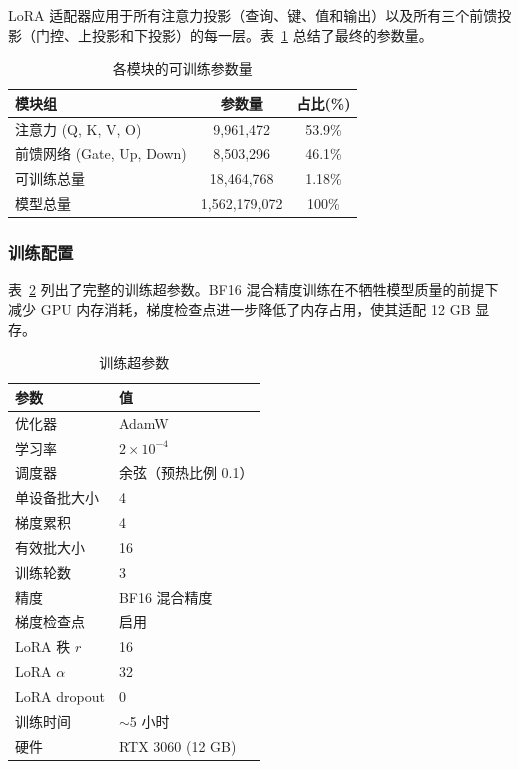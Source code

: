 \documentclass[12pt,a4paper]{article}
\begin{document}
LoRA 适配器应用于所有注意力投影（查询、键、值和输出）以及所有三个前馈投影（门控、上投影和下投影）的每一层。表~\ref{tab:lora_params} 总结了最终的参数量。

\begin{table}[ht]
\centering
\caption{各模块的可训练参数量}
\label{tab:lora_params}
\begin{tabular}{lcc}
\toprule
\textbf{模块组} & \textbf{参数量} & \textbf{占比(\%)} \\
\midrule
注意力 (Q, K, V, O) & 9,961,472 & 53.9\% \\
前馈网络 (Gate, Up, Down) & 8,503,296 & 46.1\% \\
\midrule
可训练总量 & 18,464,768 & 1.18\% \\
模型总量 & 1,562,179,072 & 100\% \\
\bottomrule
\end{tabular}
\end{table}

\subsubsection{训练配置}

表~\ref{tab:training_config} 列出了完整的训练超参数。BF16 混合精度训练在不牺牲模型质量的前提下减少 GPU 内存消耗，梯度检查点进一步降低了内存占用，使其适配 12 GB 显存。

\begin{table}[ht]
\centering
\caption{训练超参数}
\label{tab:training_config}
\begin{tabular}{ll}
\toprule
\textbf{参数} & \textbf{值} \\
\midrule
优化器 & AdamW \\
学习率 & $2 \times 10^{-4}$ \\
调度器 & 余弦（预热比例 0.1） \\
单设备批大小 & 4 \\
梯度累积 & 4 \\
有效批大小 & 16 \\
训练轮数 & 3 \\
精度 & BF16 混合精度 \\
梯度检查点 & 启用 \\
LoRA 秩 $r$ & 16 \\
LoRA $\alpha$ & 32 \\
LoRA dropout & 0 \\
\midrule
训练时间 & $\sim$5 小时 \\
硬件 & RTX 3060 (12 GB) \\
\bottomrule
\end{tabular}
\end{table}
\end{document}

